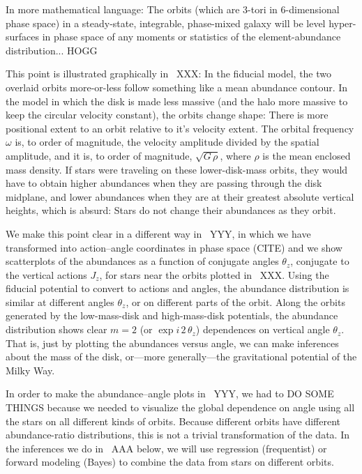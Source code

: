 \documentclass[modern]{aastex63}
\begin{document}
In more mathematical language: The orbits (which are 3-tori in
6-dimensional phase space) in a steady-state, integrable, phase-mixed
galaxy will be level hyper-surfaces in phase space of any moments or
statistics of the element-abundance distribution... HOGG

This point is illustrated graphically in \figurename~XXX:
In the fiducial model, the two overlaid orbits more-or-less follow something
like a mean abundance contour.
In the model in which the disk is made less massive (and the halo more massive
to keep the circular velocity constant), the orbits change shape: There is more
positional extent to an orbit relative to it's velocity extent.
The orbital frequency $\omega$ is, to order of magnitude, the velocity amplitude
divided by the spatial amplitude, and it is, to order of magnitude, $\sqrt{G\,\rho}$,
where $\rho$ is the mean enclosed mass density.
If stars were traveling on these lower-disk-mass orbits, they would have to
obtain higher abundances when they are passing through the disk midplane,
and lower abundances when they are at their greatest absolute vertical heights,
which is absurd: Stars do not change their abundances as they orbit.

We make this point clear in a different way in \figurename~YYY, in which
we have transformed into action--angle coordinates in phase space (CITE)
and we show scatterplots of the abundances as a function of conjugate
angles $\theta_z$, conjugate to the vertical actions $J_z$, for stars near
the orbits plotted in \figurename~XXX.
Using the fiducial potential to convert to actions and angles,
the abundance distribution is similar at different
angles $\theta_z$, or on different parts of the orbit.
Along the orbits generated by the low-mass-disk and high-mass-disk potentials,
the abundance distribution shows clear $m=2$ (or $\exp i\,2\,\theta_z$) dependences
on vertical angle $\theta_z$.
That is, just by plotting the abundances versus angle, we can make
inferences about the mass of the disk, or---more generally---the
gravitational potential of the Milky Way.

In order to make the abundance--angle plots in \figurename~YYY, we had
to DO SOME THINGS because we needed to visualize the global dependence
on angle using all the stars on all different kinds of orbits.
Because different orbits have different abundance-ratio
distributions, this is not a trivial transformation of the data.
In the inferences we do in \sectionname~AAA below, we
will use regression (frequentist) or forward modeling (Bayes) to
combine the data from stars on different orbits.
\end{document}
